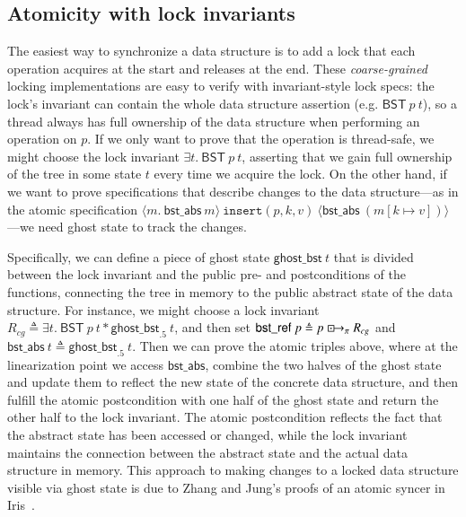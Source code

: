 \documentclass[runningheads]{llncs}
\newcommand{\islock}{\boxdotright}
\newcommand{\treerep}{\ensuremath{\mathsf{bst\_abs}}}
\newcommand{\nodeboxrep}{\ensuremath{\mathsf{bst\_ref}}}
\begin{document}
\subsection{Atomicity with lock invariants}
The easiest way to synchronize a data structure is to add a lock that
each operation acquires at the start and releases at the end. These
\emph{coarse-grained} locking implementations are easy to verify with
invariant-style lock specs: the lock's invariant can contain the whole
data structure assertion (e.g. $\mathsf{BST}\:p\ t$), so 
a thread always has full ownership of the data structure when
performing an operation on $p$.  If we only want to prove that the operation
is thread-safe, we might choose the lock invariant $\exists t.\
\mathsf{BST}\ p\ t$, asserting that we gain full ownership of the tree
in some state $t$ every time we acquire the lock. On the other hand,
if we want to prove specifications that describe changes to the data
structure---as in the atomic specification $\langle m.\ \treerep\
m\rangle\ \texttt{insert}(p, k, v)\ \langle \treerep\ (m[k \mapsto
v])\rangle$---we need ghost state to track the changes.

Specifically, we can define a piece of ghost state $\mathsf{ghost\_bst}\ t$ that is divided between the lock invariant and the public pre- and postconditions of the functions, connecting the tree in memory to the public abstract state of the data structure. For instance, we might choose a lock invariant $R_{\mathit{cg}} \triangleq \exists t.\ \mathsf{BST}\ p\ t * \mathsf{ghost\_bst}_{.5}\ t$, and then set $\nodeboxrep\ p \triangleq p \islock_\pi R_{\mathit{cg}}$ and $\treerep\ t \triangleq \mathsf{ghost\_bst}_{.5}\ t$. %
Then we can prove the atomic triples above, where at the linearization point we access $\treerep$, combine the two halves of the ghost state and update them to reflect the new state of the concrete data structure, and then fulfill the atomic postcondition with one half of the ghost state and return the other half to the lock invariant. The atomic postcondition reflects the fact that the abstract state has been accessed or changed, while the lock invariant maintains the connection between the abstract state and the actual data structure in memory. This approach to making changes to a locked data structure visible via ghost state is due to Zhang and Jung's proofs of an atomic syncer in Iris~\cite{atomic-syncer}.%
\end{document}
